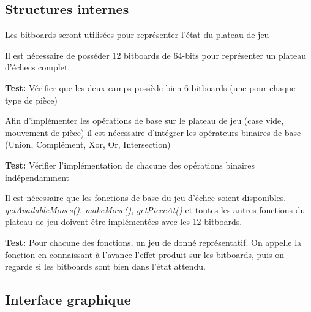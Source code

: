 \documentclass{article}
\begin{document}
\subsection{Structures internes}

\begin{needbox}
    Les bitboards seront utilisées pour représenter l'état du plateau de jeu
    \begin{subneedbox}
        Il est nécessaire de posséder 12 bitboards de 64-bits pour représenter un
        plateau d'échecs complet.

        \textbf{Test:} Vérifier que les deux camps possède bien 6 bitboards (une pour chaque type de pièce) 
    \end{subneedbox}
    \begin{subneedbox}
        Afin d'implémenter les opérations de base sur le plateau de jeu (case vide, mouvement de pièce)
        il est nécessaire d'intégrer les opérateurs binaires de base (Union, Complément, Xor, Or, Intersection)

        \textbf{Test:} Vérifier l'implémentation de chacune des opérations binaires indépendamment
    \end{subneedbox}
    \begin{subneedbox}
        Il est nécessaire que les fonctions de base du jeu d'échec soient disponibles.
        \textit{getAvailableMoves()}, \textit{makeMove()}, \textit{getPieceAt()} et toutes 
        les autres fonctions du plateau de jeu doivent être implémentées avec les 12 bitboards.

        \textbf{Test:} Pour chacune des fonctions, un jeu de donné représentatif. On appelle la fonction
        en connaissant à l'avance l'effet produit sur les bitboards, puis on regarde si les bitboards sont
        bien dans l'état attendu.
    \end{subneedbox}
    
\end{needbox}

\subsection{Interface graphique}
\end{document}
